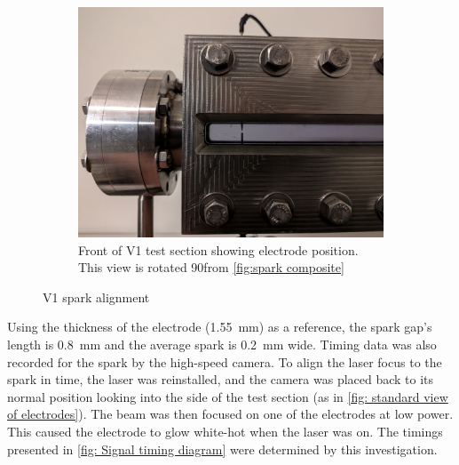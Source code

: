 \begin{figure}[!ht]
\begin{subfigure}[t]{0.25\textwidth}
                    \label{fig:spark composite}
                \end{subfigure}
                \hfill
                \begin{subfigure}[t]{0.45\textwidth}
                    \centering
                    \includegraphics[width=\textwidth]{assets/4 experiments/V1 opposing electrodes.jpg}
                    \caption{Front of V1 test section showing electrode position. This view is rotated 90\degree from \autoref{fig:spark composite}}
                    \label{fig: standard view of electrodes}
                \end{subfigure}
                \caption{V1 spark alignment}
            \end{figure}
            
            Using the thickness of the electrode (\qty{1.55}{mm}) as a reference, the spark gap's length is \qty{0.8}{mm} and the average spark is \qty{0.2}{mm} wide. Timing data was also recorded for the spark by the high-speed camera. To align the laser focus to the spark in time, the laser was reinstalled, and the camera was placed back to its normal position looking into the side of the test section (as in \autoref{fig: standard view of electrodes}). The beam was then focused on one of the electrodes at low power. This caused the electrode to glow white-hot when the laser was on. The timings presented in \autoref{fig: Signal timing diagram} were determined by this investigation.

